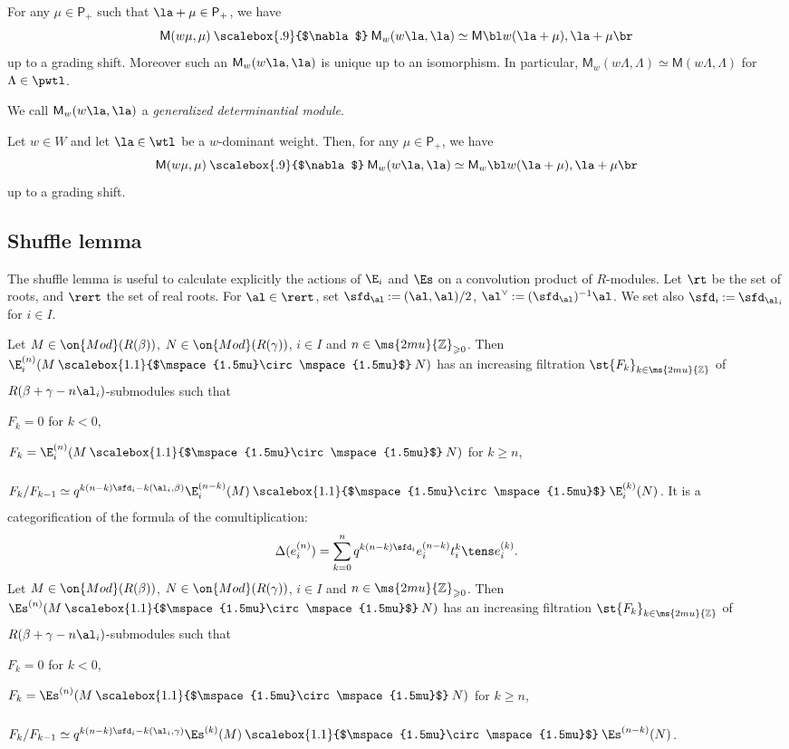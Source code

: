 \documentclass[12pt,leqno]{amsart}%
\renewcommand{\ge}{\geqslant}
\theoremstyle{plain}
\theoremstyle{definition}
\newcommand{\Z}{\ms{2mu}{\mathbb Z}}
\newcommand{\seteq}{\mathbin{:=}}
\newcommand{\Mod}{\on{Mod}}
\newcommand{\conv}[1][]{
\underset{\raisebox{.5ex}{$\scriptstyle{#1}$}}{\mathbin{\scalebox{1.1}{$\mspace{1.5mu}\circ\mspace{1.5mu}$}}}}
\newcommand{\hconv}{\mathbin{\scalebox{.9}{$\nabla$}}}
\newcommand{\wlP}{\mathsf{P}}   %
\newcommand{\La}{\Lambda} 			%
\newcommand{\Mm}{{\mathsf{M}}}
\newcommand{\bna}{\be[{\rm(a)}]}
\numberwithin{equation}{section}
\begin{document}
\item
For any $\mu\in\wlP_+$ such that
$\la+\mu\in\wlP_+$,  we have
$$\Mm(w\mu,\mu)\hconv \Mm_w(w\la,\la)\simeq\Mm\bl w(\la+\mu),\la+\mu\br$$
up to a grading shift.\label{item:wla}
Moreover such an $\Mm_w(w\la,\la)$ is unique up to an isomorphism.
\ee
In particular,
$\Mm_w(w\La,\La)\simeq\Mm(w\La,\La)$ for $\La\in\pwtl$.
\enth

We call $\Mm_w(w\la,\la)$ a {\em generalized determinantial module}.

%


 \label{lem:MhconvMw}
Let $w\in W$ and let $\la\in \wtl$
be a $w$-dominant weight.
Then, for any $\mu\in\wlP_+$,  we have
$$\Mm(w\mu,\mu)\hconv \Mm_w(w\la,\la)\simeq\Mm_w\bl w(\la+\mu),\la+\mu\br$$
up to a grading shift.
\enlemma




\subsection{Shuffle lemma}

The shuffle lemma is useful to calculate explicitly 
the actions of $\E_i$ and $\Es$ on a convolution product 
of $R$-modules.
Let $\rt$ be the set of roots, and $\rert$ the set of real roots.
For $\al\in\rert$, set $\sfd_\al\seteq(\al,\al)/2$, $\al^\vee\seteq(\sfd_\al)^{-1}\al$.
We set also $\sfd_i\seteq\sfd_{\al_i}$ for $i\in I$.


\label{lem:shuffleE}
Let $M\in\Mod(R(\beta))$, $N\in\Mod(R(\gamma))$, $i\in I$ and $n\in\Z_{\ge0}$.
Then $\E_i^{(n)}(M\conv N)$ has an increasing filtration $\st{F_k}_{k\in\Z}$ of
$R(\beta+\gamma-n\al_i)$-submodules such that
\bna
\item $F_k=0$ for $k<0$,
\item $F_k=\E_i^{(n)}(M\conv N)$ for $k\ge n$,
\item $F_k/F_{k-1}\simeq q^{k(n-k)\sfd_i-k(\al_i,\beta)}\E_i^{(n-k)}(M)\conv \E_i^{(k)}(N)$.
\ee
\enlemma
It is a categorification of the formula of the comultiplication:
$$\Delta(e_i^{(n)})=\sum_{k=0}^n q^{k(n-k)\sfd_i}e_i^{(n-k)}t_i^{k}\tens e_i^{(k)}.
$$
\label{lem:shuffleEs}
Let $M\in\Mod(R(\beta))$, $N\in\Mod(R(\gamma))$, $i\in I$ and $n\in\Z_{\ge0}$.
Then $\Es^{(n)}(M\conv N)$ has an increasing filtration $\st{F_k}_{k\in\Z}$ of
$R(\beta+\gamma-n\al_i)$-submodules such that
\bna
\item $F_k=0$ for $k<0$,
\item $F_k=\Es^{(n)}(M\conv N)$ for $k\ge n$,
\item $F_k/F_{k-1}\simeq q^{k(n-k)\sfd_i-k(\al_i,\gamma)}\Es^{(k)}(M)\conv \Es^{(n-k)}(N)$.
\ee
\enlemma
\end{document}
